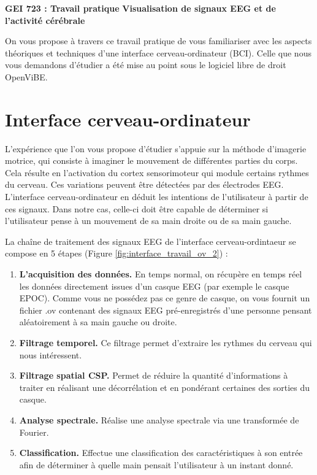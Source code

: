 \newpage
\thispagestyle{fancy}

\begin{center}
\huge\textbf{GEI 723 : Travail pratique}
\bigbreak
\LARGE\textbf{Visualisation de signaux EEG et de l'activité cérébrale}
\bigbreak
\end{center}

\normalsize

On vous propose à travers ce travail pratique de vous familiariser avec les aspects théoriques et techniques d'une interface cerveau-ordinateur (BCI). Celle que nous vous demandons d'étudier a été mise au point sous le logiciel libre de droit OpenViBE.

\newpage
\section*{Interface cerveau-ordinateur}

L'expérience que l'on vous propose d'étudier s'appuie sur la méthode d'imagerie motrice, qui consiste à imaginer le mouvement de différentes parties du corps. Cela résulte en l'activation du cortex sensorimoteur qui module certains rythmes du cerveau. Ces variations peuvent être détectées par des électrodes EEG. L'interface cerveau-ordinateur en déduit les intentions de l'utilisateur à partir de ces signaux. Dans notre cas, celle-ci doit être capable de déterminer si l'utilisateur pense à un mouvement de sa main droite ou de sa main gauche.

La chaîne de traitement des signaux EEG de l'interface cerveau-ordintaeur se compose en 5 étapes (Figure	\ref{fig:interface_travail_ov_2}) : 

\begin{enumerate}
	\item \textbf{L'acquisition des données.} En temps normal, on récupère en temps réel les données directement issues d'un casque EEG (par exemple le casque EPOC). Comme vous ne possédez pas ce genre de casque, on vous fournit un fichier .ov contenant des signaux EEG pré-enregistrés d'une personne pensant aléatoirement à sa main gauche ou droite.
	\smallbreak
	\item \textbf{Filtrage temporel.} Ce filtrage permet d'extraire les rythmes du cerveau qui nous intéressent.
	\smallbreak
	\item \textbf{Filtrage spatial CSP.} Permet de réduire la quantité d'informations à traiter en réalisant une décorrélation et en pondérant certaines des sorties du casque. 
	\smallbreak
	\item \textbf{Analyse spectrale.} Réalise une analyse spectrale via une transformée de Fourier.
	\smallbreak
	\item \textbf{Classification.} Effectue une classification des caractéristiques à son entrée afin de déterminer à quelle main pensait l'utilisateur à un instant donné. 
\end{enumerate}

